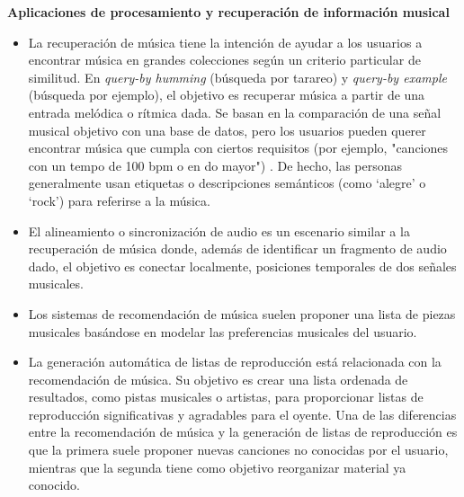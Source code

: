 \textbf{Aplicaciones de procesamiento y recuperación de información musical}
\begin{itemize}
    \item La recuperación de música tiene la intención de ayudar a los usuarios a encontrar música en grandes colecciones según un criterio particular de similitud. En \textit{query-by humming} (búsqueda por tarareo) y \textit{query-by example} (búsqueda por ejemplo), el objetivo es recuperar música a partir de una entrada melódica o rítmica dada. Se basan en la comparación de una señal musical objetivo con una base de datos, pero los usuarios pueden querer encontrar música que cumpla con ciertos requisitos (por ejemplo, "canciones con un tempo de 100 bpm o en do mayor") \cite{Schedl2014MusicIR}. De hecho, las personas generalmente usan etiquetas o descripciones semánticos (como `alegre'  o `rock') para referirse a la música. 
    \item El alineamiento o sincronización de audio es un escenario similar a la recuperación de música donde, además de identificar un fragmento de audio dado, el objetivo es conectar localmente, posiciones temporales de dos señales musicales.
    \item Los sistemas de recomendación de música suelen proponer una lista de piezas musicales basándose en modelar las preferencias musicales del usuario.
    \item La generación automática de listas de reproducción está relacionada con la recomendación de música. Su objetivo es crear una lista ordenada de resultados, como pistas musicales o artistas, para proporcionar listas de reproducción significativas y agradables para el oyente. Una de las diferencias entre la recomendación de música y la generación de listas de reproducción es que la primera suele proponer nuevas canciones no conocidas por el usuario, mientras que la segunda tiene como objetivo reorganizar material ya conocido.
\end{itemize}


